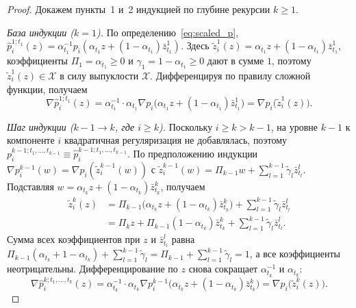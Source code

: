 \documentclass[11pt, a4paper]{article}
\theoremstyle{definition}
\begin{document}
\begin{proof}
Докажем пункты~1 и~2 индукцией по глубине рекурсии $k \ge 1$.

\emph{База индукции ($k = 1$).} По определению~\eqref{eq:scaled_p}, $\hat{p}_i^{1; t_1}(z) = \alpha_{t_1}^{-1} p_i(\alpha_{t_1} z + (1 - \alpha_{t_1})\bar{z}_{t_1}^1)$. Здесь $\tilde{z}_i^1(z) = \alpha_{t_1} z + (1 - \alpha_{t_1})\bar{z}_{t_1}^1$, коэффициенты $\Pi_1 = \alpha_{t_1} \ge 0$ и $\gamma_1 = 1 - \alpha_{t_1} \ge 0$ дают в сумме $1$, поэтому $\tilde{z}_i^1(z) \in \mathcal{X}$ в силу выпуклости $\mathcal{X}$. Дифференцируя по правилу сложной функции, получаем
\[
\nabla \hat{p}_i^{1; t_1}(z) = \alpha_{t_1}^{-1} \cdot \alpha_{t_1} \nabla p_i\big(\alpha_{t_1} z + (1 - \alpha_{t_1})\bar{z}_{t_1}^1\big) = \nabla p_i\big(\tilde{z}_i^1(z)\big).
\]

\emph{Шаг индукции ($k - 1 \to k$, где $i \ge k$).} Поскольку $i \ge k > k - 1$, на уровне $k - 1$ к компоненте $i$ квадратичная регуляризация не добавлялась, поэтому $p_i^{k-1; t_1, \dots, t_{k-1}} \equiv \hat{p}_i^{k-1; t_1, \dots, t_{k-1}}$. По предположению индукции $\nabla p_i^{k-1}(w) = \nabla p_i(\tilde{z}_i^{k-1}(w))$ с $\tilde{z}_i^{k-1}(w) = \Pi_{k-1} w + \sum_{l=1}^{k-1} \tilde{\gamma}_l \bar{z}_{t_l}^l$. Подставляя $w = \alpha_{t_k} z + (1 - \alpha_{t_k})\bar{z}_{t_k}^k$, получаем
\begin{align*}
\tilde{z}_i^k(z) &= \Pi_{k-1}\big(\alpha_{t_k} z + (1 - \alpha_{t_k})\bar{z}_{t_k}^k\big) + \sum_{l=1}^{k-1} \tilde{\gamma}_l \bar{z}_{t_l}^l \\
&= \Pi_k z + \Pi_{k-1}(1 - \alpha_{t_k})\bar{z}_{t_k}^k + \sum_{l=1}^{k-1} \tilde{\gamma}_l \bar{z}_{t_l}^l.
\end{align*}
Сумма всех коэффициентов при $z$ и $\bar{z}_{t_l}^l$ равна $\Pi_{k-1}(\alpha_{t_k} + 1 - \alpha_{t_k}) + \sum_{l=1}^{k-1} \tilde{\gamma}_l = \Pi_{k-1} + \sum_{l=1}^{k-1} \tilde{\gamma}_l = 1$, а все коэффициенты неотрицательны. Дифференцирование по $z$ снова сокращает $\alpha_{t_k}^{-1}$ и $\alpha_{t_k}$:
\[
\nabla \hat{p}_i^{k; t_1, \dots, t_k}(z) = \alpha_{t_k}^{-1} \cdot \alpha_{t_k} \nabla p_i^{k-1}\big(\alpha_{t_k} z + (1 - \alpha_{t_k})\bar{z}_{t_k}^k\big) = \nabla p_i\big(\tilde{z}_i^k(z)\big).
\]


\end{proof}
\end{document}
